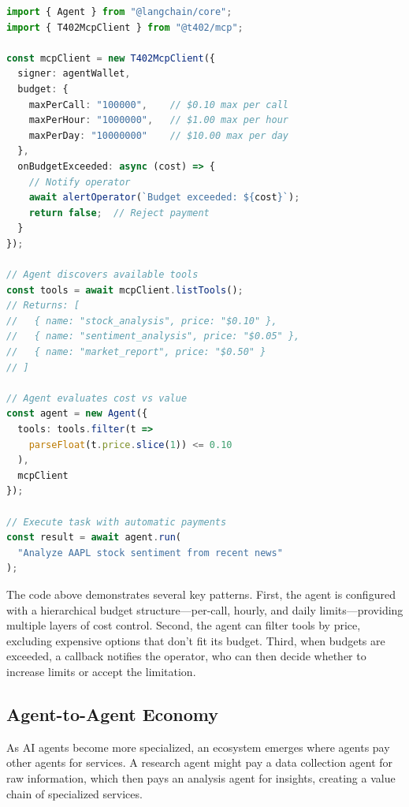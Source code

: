 \begin{lstlisting}[language=typescript,caption={AI agent with budget management for MCP tools}]
import { Agent } from "@langchain/core";
import { T402McpClient } from "@t402/mcp";

const mcpClient = new T402McpClient({
  signer: agentWallet,
  budget: {
    maxPerCall: "100000",    // $0.10 max per call
    maxPerHour: "1000000",   // $1.00 max per hour
    maxPerDay: "10000000"    // $10.00 max per day
  },
  onBudgetExceeded: async (cost) => {
    // Notify operator
    await alertOperator(`Budget exceeded: ${cost}`);
    return false;  // Reject payment
  }
});

// Agent discovers available tools
const tools = await mcpClient.listTools();
// Returns: [
//   { name: "stock_analysis", price: "$0.10" },
//   { name: "sentiment_analysis", price: "$0.05" },
//   { name: "market_report", price: "$0.50" }
// ]

// Agent evaluates cost vs value
const agent = new Agent({
  tools: tools.filter(t =>
    parseFloat(t.price.slice(1)) <= 0.10
  ),
  mcpClient
});

// Execute task with automatic payments
const result = await agent.run(
  "Analyze AAPL stock sentiment from recent news"
);
\end{lstlisting}

The code above demonstrates several key patterns. First, the agent is configured with a hierarchical budget structure---per-call, hourly, and daily limits---providing multiple layers of cost control. Second, the agent can filter tools by price, excluding expensive options that don't fit its budget. Third, when budgets are exceeded, a callback notifies the operator, who can then decide whether to increase limits or accept the limitation.

\subsection{Agent-to-Agent Economy}

As AI agents become more specialized, an ecosystem emerges where agents pay other agents for services. A research agent might pay a data collection agent for raw information, which then pays an analysis agent for insights, creating a value chain of specialized services.

